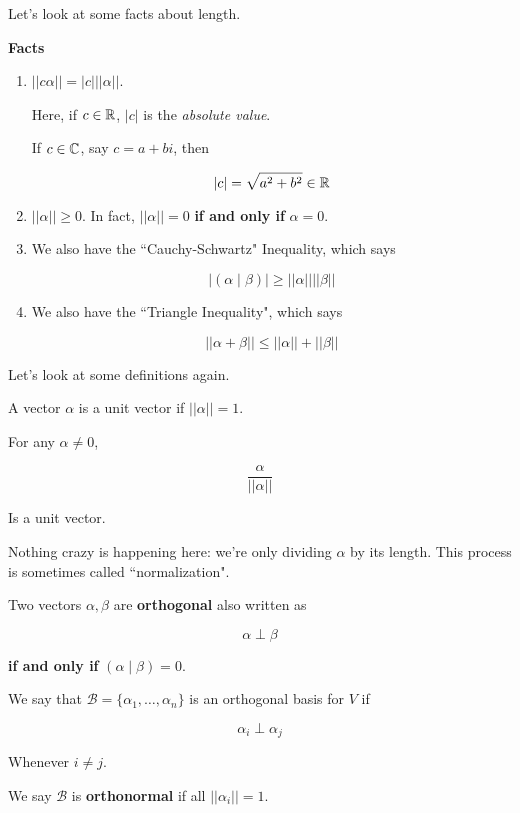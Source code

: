 \documentclass[12pt]{article}
\def\B{\mathcal B}
\newcommand{\ip}[2]{\left( #1 \mid #2 \right)}
\begin{document}
  Let's look at some facts about length.

  {\bf Facts}

  \begin{enumerate}
    \item $||c \alpha|| = |c| ||\alpha||$.

      Here, if $c \in {\mathbb R}$, $|c|$ is the {\it absolute value}.

      If $c \in {\mathbb C}$, say $c = a + bi$, then

      \[
        |c| = \sqrt{a^2 + b^2} \in {\mathbb R}
      \]

    \item $||\alpha|| \ge 0$. In fact, $||\alpha|| = 0$ {\bf if and only if}
      $\alpha = 0$.

    \item We also have the ``Cauchy-Schwartz" Inequality, which says

      \[
        |\ip{\alpha}{\beta}| \ge ||\alpha|| ||\beta||
      \]

    \item We also have the ``Triangle Inequality", which says

      \[
        ||\alpha + \beta|| \le ||\alpha|| + ||\beta||
      \]
  \end{enumerate}

  Let's look at some definitions again.

  {
    A vector $\alpha$ is a unit vector if $||\alpha|| = 1$.

    For any $\alpha \ne 0$,

    \[
      \frac{\alpha}{||\alpha||}
    \]

    Is a unit vector.

    Nothing crazy is happening here: we're only dividing $\alpha$ by its length.
    This process is sometimes called ``normalization".
  }

  {
    Two vectors $\alpha, \beta$ are {\bf orthogonal} also written as

    \[
      \alpha \perp \beta
    \]

    {\bf if and only if} $\ip{\alpha}{\beta} = 0$.
  }

  {
    We say that $\B = \{\alpha_1, \dots, \alpha_n\}$ is an orthogonal basis for
    $V$ if

    \[
      \alpha_i \perp \alpha_j
    \]

    Whenever $i \ne j$.

    We say $\B$ is {\bf orthonormal} if all $||\alpha_i|| = 1$.
  }
\end{document}

